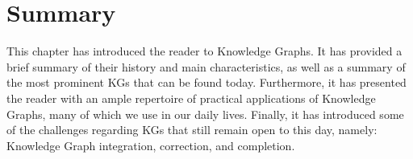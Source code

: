 \section{Summary}\label{sec:kgs-summary}
This chapter has introduced the reader to Knowledge Graphs. It has provided a brief summary of their history and main characteristics, as well as a summary of the most prominent KGs that can be found today. Furthermore, it has presented the reader with an ample repertoire of practical applications of Knowledge Graphs, many of which we use in our daily lives. Finally, it has introduced some of the challenges regarding KGs that still remain open to this day, namely: Knowledge Graph integration, correction, and completion.
